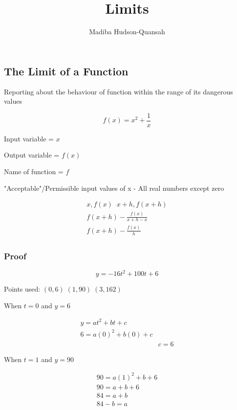 \documentclass[12pt letter]{report}
\title{\Huge{Limits}}
\author{\huge{Madiba Hudson-Quansah}}
\date{}
\begin{document}
\maketitle
\newpage
{}
\tableofcontents
\pagebreak

\chapter{}
\section{The Limit of a Function}
Reporting about the behaviour of function within the range of its dangerous values


\begin{displaymath}
	f(x) = x^2 + \frac{1}{x}
\end{displaymath}

Input variable = $x$

Output variable = $f(x)$

Name of function = $f$


"Acceptable"/Permissible input values of x - All real numbers except zero

\begin{gather*}
	x, f(x) \;\; x+h, f(x+h)      \\
	f(x+h) - \frac{f(x)}{x+h-x} \\
	f(x+h) - \frac{f(x)}{h}         \\
\end{gather*}

\subsection{Proof}

\[y = -16t^2+100t+6\]

Points used:
$(0, 6) \; (1, 90) \; (3,162)$

When $t = 0$ and $y = 6$

\begin{align*}
	y = at^2 + bt+c      \\
	6 = a(0)^2 + b(0) +c \\
	 & c = 6
\end{align*}

When $t=1$ and $y=90$

\begin{align*}
	90 = a(1)^2 +b +6 \\
	90 = a + b + 6    \\
	84 = a + b        \\
	84 - b = a
\end{align*}
\end{document}
